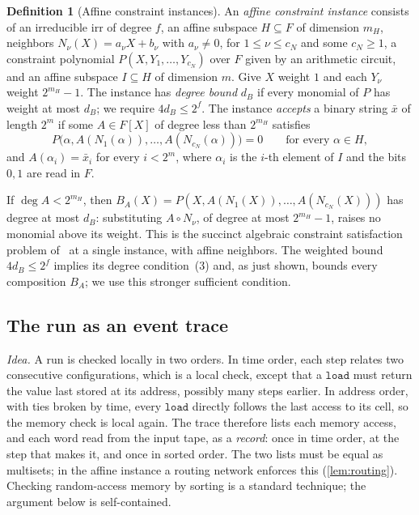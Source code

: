\documentclass[11pt,letterpaper]{article}
\theoremstyle{definition}
\newtheorem{definition}[theorem]{Definition}
\theoremstyle{remark}
\begin{document}
\begin{definition}[Affine constraint instances]\label{def:acsp}
An \emph{affine constraint instance} consists of an irreducible
\(\mathrm{irr}\) of degree \(f\), an affine subspace \(H\subseteq F\) of
dimension \(m_H\), neighbors \(N_\nu(X)=a_\nu X+b_\nu\) with
\(a_\nu\ne0\), for \(1\le\nu\le c_N\) and some \(c_N\ge1\), a constraint
polynomial \(P(X,Y_1,\ldots,Y_{c_N})\) over \(F\) given by an arithmetic
circuit, and an affine subspace \(I\subseteq H\) of dimension \(m\).
Give \(X\) weight \(1\) and each \(Y_\nu\) weight \(2^{m_H}-1\). The
instance has \emph{degree bound} \(d_B\) if every monomial of \(P\) has
weight at most \(d_B\); we require \(4d_B\le2^f\). The instance
\emph{accepts} a binary string \(\bar x\) of length \(2^m\) if some
\(A\in F[X]\) of degree less than \(2^{m_H}\) satisfies
\[
 P\bigl(\alpha,A(N_1(\alpha)),\ldots,A(N_{c_N}(\alpha))\bigr)=0
 \qquad\text{for every }\alpha\in H,
\]
and \(A(\alpha_i)=\bar x_i\) for every \(i<2^m\), where \(\alpha_i\) is
the \(i\)-th element of \(I\) and the bits \(0,1\) are read in \(F\).
\end{definition}

If \(\deg A<2^{m_H}\), then
\(B_A(X)=P(X,A(N_1(X)),\ldots,A(N_{c_N}(X)))\) has degree at most
\(d_B\): substituting \(A\circ N_\nu\), of degree at most
\(2^{m_H}-1\), raises no monomial above its weight. This is the succinct
algebraic constraint satisfaction problem
of~\cite[Definition~7.1]{BCGT13} at a single instance, with affine
neighbors. The weighted bound \(4d_B\le2^f\) implies its degree
condition~(3) and, as just shown, bounds every composition \(B_A\); we
use this stronger sufficient condition.

\subsection{The run as an event trace}\label{app:event-trace}

\emph{Idea.} A run is checked locally in two orders. In time order,
each step relates two consecutive configurations, which is a local
check, except that a \(\mathtt{load}\) must return the value last stored
at its address, possibly many steps earlier. In address order, with
ties broken by time, every \(\mathtt{load}\) directly follows the last
access to its cell, so the memory check is local again. The trace
therefore lists each memory access, and each word read from the input
tape, as a \emph{record}: once in time order, at the step that makes
it, and once in sorted order. The two lists must be equal as multisets;
in the affine instance a routing network enforces this
(\cref{lem:routing}). Checking random-access memory by sorting is a
standard technique; the argument below is self-contained.
\end{document}
